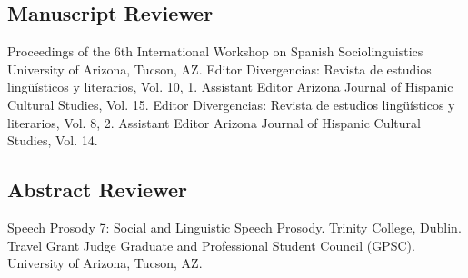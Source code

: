 \documentclass[11pt,letterpaper]{assets/tex/moderncv}
\begin{document}
\subsection{Manuscript Reviewer}

        {Proceedings of the 6th International Workshop on Spanish Sociolinguistics}
        {}
        {}
        {}
        {University of Arizona, Tucson, AZ.}
        {Editor}
        {Divergencias: Revista de estudios ling\"u\'isticos y literarios, Vol. 10, 1.}
        {}
        {}
        {}
        {Assistant Editor}
        {Arizona Journal of Hispanic Cultural Studies, Vol. 15.}
        {}
        {}
        {}
        {Editor}
        {Divergencias: Revista de estudios ling\"u\'isticos y literarios, Vol. 8, 2.}
        {}
        {}
        {}
        {Assistant Editor}
        {Arizona Journal of Hispanic Cultural Studies, Vol. 14.}
        {}
        {}
        {}

\subsection{Abstract Reviewer}

        {Speech Prosody 7: Social and Linguistic Speech Prosody.}
        {}
        {}
        {}
        {Trinity College, Dublin.}
        {Travel Grant Judge}
        {Graduate and Professional Student Council (GPSC).}
        {}
        {}
        {University of Arizona, Tucson, AZ.}
\end{document}
